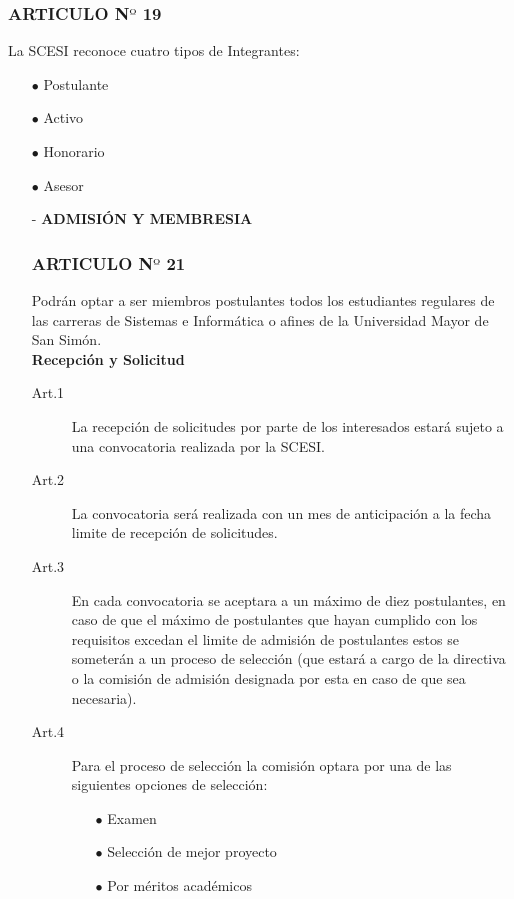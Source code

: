 \documentclass[11pt,letterpaper]{book}
\begin{document}
\subsubsection*{ARTICULO N$º$ 19}
La SCESI reconoce cuatro tipos de Integrantes:
\begin{itemize}
	\item[$\bullet$] Postulante 
	\item[$\bullet$] Activo 
	\item[$\bullet$] Honorario 
	\item[$\bullet$] Asesor 
\end{itemize}
\begin{itemize}
\item[-] {\bf ADMISIÓN Y MEMBRESIA}
\subsubsection*{ARTICULO N$º$ 21}
Podrán optar a ser miembros postulantes todos los estudiantes regulares de las carreras de Sistemas e Informática o afines de la Universidad Mayor de San Simón.\\ 
{\bf Recepción y Solicitud}\\
\begin{description}
\item[Art.1] La recepción de solicitudes por parte de los interesados estará sujeto a una 	convocatoria realizada por la SCESI.\\
\item[Art.2] La convocatoria será realizada con un mes de anticipación a la fecha limite de 	recepción de solicitudes.\\
\item[Art.3] En cada convocatoria se aceptara a un máximo de diez postulantes, en caso de que el máximo de postulantes que hayan cumplido con los requisitos excedan el limite de admisión de postulantes estos se someterán a un proceso de selección (que estará a cargo de la directiva o la comisión de admisión designada por esta en caso de que sea necesaria).\\
\item[Art.4] Para el proceso de selección la comisión optara por una de las siguientes opciones de selección:\\
\begin{itemize}
\item[$\bullet$] Examen 
\item[$\bullet$] Selección de mejor proyecto 
\item[$\bullet$] Por méritos académicos 

\end{itemize}
\end{description}
\end{itemize}
\end{document}
